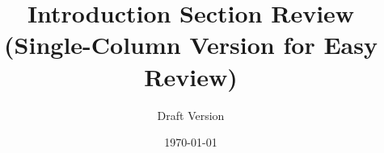 \documentclass[12pt,a4paper]{article}
\begin{document}
\title{Introduction Section Review\\
\large (Single-Column Version for Easy Review)}
\author{Draft Version}
\date{\today}
\maketitle



\end{document}
